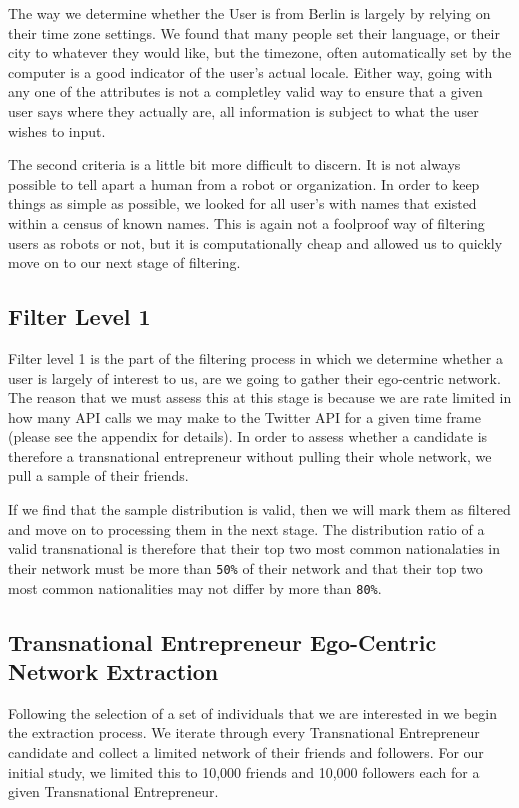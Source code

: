 The way we determine whether the User is from Berlin is largely by relying on their time zone settings. We found that many people set their language, or their city to whatever they would like, but the timezone, often automatically set by the computer is a good indicator of the user's actual locale. Either way, going with any one of the attributes is not a completley valid way to ensure that a given user says where they actually are, all information is subject to what the user wishes to input.
\par
The second criteria is a little bit more difficult to discern. It is not always possible to tell apart a human from a robot or organization. In order to keep things as simple as possible, we looked for all user's with names that existed within a census of known names. This is again not a foolproof way of filtering users as robots or not, but it is computationally cheap and allowed us to quickly move on to our next stage of filtering.

\subsection{Filter Level 1}
Filter level 1 is the part of the filtering process in which we determine whether a user is largely of interest to us, are we going to gather their ego-centric network. The reason that we must assess this at this stage is because we are rate limited in how many API calls we may make to the Twitter API for a given time frame (please see the appendix for details). In order to assess whether a candidate is therefore a transnational entrepreneur without pulling their whole network, we pull a sample of their friends.
\par
If we find that the sample distribution is valid, then we will mark them as filtered and move on to processing them in the next stage. The distribution ratio of a valid transnational is therefore that their top two most common nationalaties in their network must be more than \verb|50%| of their network and that their top two most common nationalities may not differ by more than \verb|80%|.

\subsection{Transnational Entrepreneur Ego-Centric Network Extraction}
Following the selection of a set of individuals that we are interested in we begin the extraction process. We iterate through every Transnational Entrepreneur candidate and collect a limited network of their friends and followers. For our initial study, we limited this to 10,000 friends and 10,000 followers each for a given Transnational Entrepreneur.

